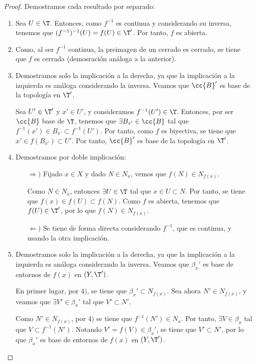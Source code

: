 \begin{proof}
    Demostramos cada resultado por separado:
    \begin{enumerate}
        \item Sea $U\in \T$. Entonces, como $f^{-1}$ es continua y considerando su inversa, tenemos que
        $(f^{-1})^{-1}(U)=f(U)\in \T'$. Por tanto, $f$ es abierta.

        \item Como, al ser $f^{-1}$ continua, la preimagen de un cerrado es cerrado, se tiene que $f$ es cerrada (demosración análoga a la anterior).

        \item Demostramos solo la implicación a la derecha, ya que la implicación a la izquierda es análoga considerando la inversa. Veamos que $\cc{B}'$ es base de la topología en $\T'$.
        
        Sea $U'\in \T'$ y $x'\in U'$, y consideramos $f^{-1}(U')\in \T$. Entonces, por ser $\cc{B}$ base de $\T$, tenemos que $\exists B_{x'}\in \cc{B}$ tal que $f^{-1}(x')\in B_{x'}\subset f^{-1}(U')$. Por tanto, como $f$ es biyectiva, se tiene que $x'\in f(B_{x'})\subset U'$. Por tanto, $\cc{B}'$ es base de la topología en $\T'$.

        \item Demostramos por doble implicación:
        \begin{itemize}
            \item[$\Longrightarrow)$] Fijado $x\in X$ y dado $N\in N_x$, vemos que $f(N)\in N_{f(x)}$.
        
            Como $N\in N_x$, entonces $\exists U\in \T$ tal que $x\in U\subset N$. Por tanto, se tiene que $f(x)\in f(U)\subset f(N)$. Como $f$ es abierta, tenemos que $f(U)\in \T'$, por lo que $f(N)\in N_{f(x)}$.

            \item[$\Longleftarrow)$] Se tiene de forma directa considerando $f^{-1}$, que es continua, y usando la otra implicación.
        \end{itemize}

        \item Demostramos solo la implicación a la derecha, ya que la implicación a la izquierda es análoga considerando la inversa. Veamos que $\beta_x'$ es base de entornos de $f(x)$ en $(Y,\T')$.
        
        En primer lugar, por $4)$, se tiene que $\beta_x'\subset N_{f(x)}$. Sea ahora $N'\in N_{f(x)}$, y veamos que $\exists V'\in \beta_x'$ tal que $V'\subset N'$.
        
        Como $N'\in N_{f(x)}$, por $4)$ se tiene que $f^{-1}(N')\in N_x$. Por tanto, $\exists V\in \beta_x$ tal que $V\subset f^{-1}(N')$. Notando $V'=f(V)\in \beta_x'$, se tiene que $V'\subset N'$, por lo que $\beta_x'$ es base de entornos de $f(x)$ en $(Y,\T')$.
    \end{enumerate}
\end{proof}


